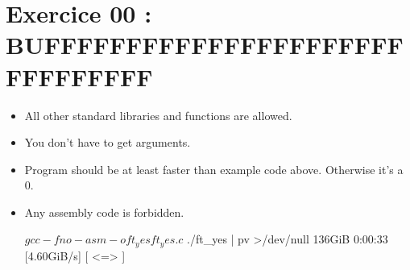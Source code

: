 \documentclass{42-en}
\begin{document}
\newpage

\chapter{Exercice 00 : BUFFFFFFFFFFFFFFFFFFFFFFFFFFFFFFF}

\makeheaderfilesforbidden
\begin{itemize}

	\item All other standard libraries and functions are allowed.
	\item You don't have to get arguments.
	\item Program should be at least faster than example code above. Otherwise it's a 0.
	\item Any assembly code is forbidden.
	\begin{42console}
		$ gcc -fno-asm -o ft_yes ft_yes.c
		$ ./ft_yes | pv >/dev/null
		136GiB 0:00:33 [4.60GiB/s] [    <=>                                            ]
	\end{42console}

\end{itemize}

\end{document}
